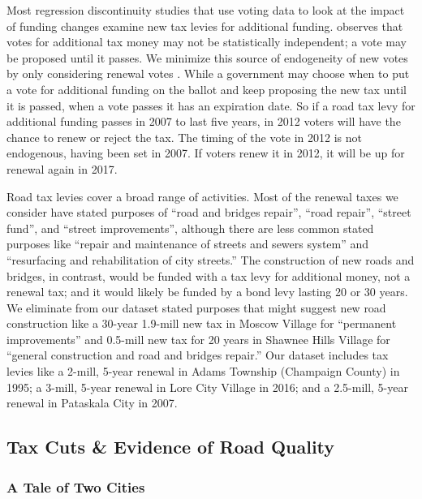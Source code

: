 Most regression discontinuity studies that use voting data to look at the impact of funding changes examine new tax levies for additional funding.  \cite{cellini2010value} observes that votes for additional tax money may not be statistically independent; a vote may be proposed until it passes.  We minimize this source of endogeneity of new votes by only considering renewal votes \citep{brasington2017school}.  While a government may choose when to put a vote for additional funding on the ballot and keep proposing the new tax until it is passed, when a vote passes it has an expiration date.  So if a road tax levy for additional funding passes in 2007 to last five years, in 2012 voters will have the chance to renew or reject the tax.  The timing of the vote in 2012 is not endogenous, having been set in 2007.  If voters renew it in 2012, it will be up for renewal again in 2017. 

Road tax levies cover a broad range of activities.  Most of the renewal taxes we consider have stated purposes of “road and bridges repair”, “road repair”, “street fund”, and “street improvements”, although there are less common stated purposes like “repair and maintenance of streets and sewers system” and “resurfacing and rehabilitation of city streets.”  The construction of new roads and bridges, in contrast, would be funded with a tax levy for additional money, not a renewal tax; and it would likely be funded by a bond levy lasting 20 or 30 years.  We eliminate from our dataset stated purposes that might suggest new road construction like a 30-year 1.9-mill new tax in Moscow Village for “permanent improvements” and 0.5-mill new tax for 20 years in Shawnee Hills Village for “general construction and road and bridges repair.” Our dataset includes tax levies like a 2-mill, 5-year renewal in Adams Township (Champaign County) in 1995; a 3-mill, 5-year renewal in Lore City Village in 2016; and a 2.5-mill, 5-year renewal in Pataskala City in 2007.


\subsection{Tax Cuts \& Evidence of Road Quality}


\subsubsection{A Tale of Two Cities}

